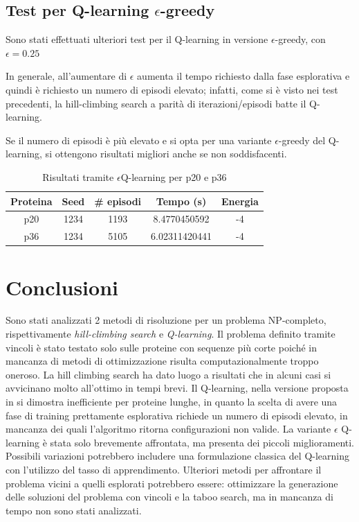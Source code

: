 \documentclass[conference]{IEEEtran}
\begin{document}
\subsection{Test per Q-learning $\epsilon$-greedy}

Sono stati effettuati ulteriori test per il Q-learning in versione $\epsilon$-greedy, con $\epsilon = 0.25$

In generale, all'aumentare di $\epsilon$ aumenta il tempo richiesto dalla fase esplorativa e quindi è richiesto un numero di episodi elevato; infatti, come si è visto nei test precedenti, la hill-climbing search a parità di iterazioni/episodi batte il Q-learning.

Se il numero di episodi è più elevato e si opta per una variante $\epsilon$-greedy del Q-learning, si ottengono risultati migliori anche se non soddisfacenti.

\begin{table}[H]
\begin{center}
\begin{tabular}{|c|c|c|c|c|}
\hline
\textbf{Proteina} & \textbf{Seed} & \textbf{\# episodi} & \textbf{Tempo (s)} & \textbf{Energia} \\ \hline
p20 & 1234 & 1193 & 8.4770450592 & -4 \\ \hline
p36 & 1234 & 5105 & 6.02311420441 & -4 \\ \hline
\end{tabular}
\end{center}
\caption{Risultati tramite $\epsilon$Q-learning per p20 e p36}
\end{table}

\section{Conclusioni}

Sono stati analizzati 2 metodi di risoluzione per un problema NP-completo, rispettivamente \textit{hill-climbing search} e \textit{Q-learning}. Il problema definito tramite vincoli è stato testato solo sulle proteine con sequenze più corte poiché in mancanza di metodi di ottimizzazione risulta computazionalmente troppo oneroso. La hill climbing search ha dato luogo a risultati che in alcuni casi si avvicinano molto all'ottimo in tempi brevi.
Il Q-learning, nella versione proposta in \cite{CzibulaPFP} si dimostra inefficiente per proteine lunghe, in quanto la scelta di avere una fase di training prettamente esplorativa richiede un numero di episodi elevato, in mancanza dei quali l'algoritmo ritorna configurazioni non valide.
La variante $\epsilon$ Q-learning è stata solo brevemente affrontata, ma presenta dei piccoli miglioramenti. Possibili variazioni potrebbero includere una formulazione classica del Q-learning con l'utilizzo del tasso di apprendimento.
Ulteriori metodi per affrontare il problema vicini a quelli esplorati potrebbero essere: ottimizzare la generazione delle soluzioni del problema con vincoli e la taboo search, ma in mancanza di tempo non sono stati analizzati.
\end{document}
